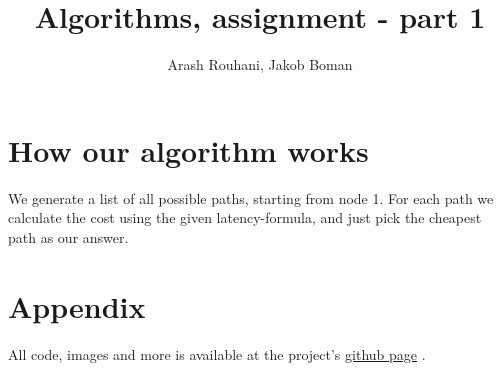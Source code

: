 \documentclass[a4paper,11pt]{article}
\title{Algorithms, assignment - part 1}
\author{Arash Rouhani, Jakob Boman}
\begin{document}
\maketitle

\section{How our algorithm works}
We generate a list of all possible paths, starting from node 1. For each path we calculate the cost using the given latency-formula, and just pick the cheapest path as our answer.

\section{Appendix}
All code, images and more is available at the project's \href{https://github.com/biforboman/Algorithms-TIN092}{github page} .
\end{document}
